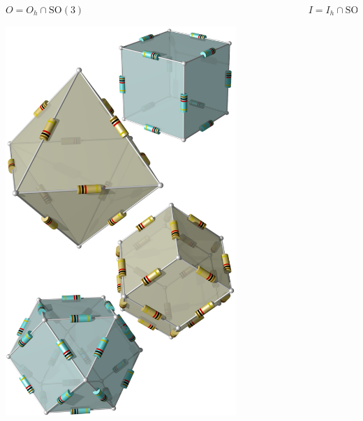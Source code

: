 \begin{frame}[t]
\begin{columns}[t,onlytextwidth]
\begin{column}{0.33\textwidth}
\begin{block}{$O = O_h \cap \operatorname{SO(3)}$}
\begin{center}
\includegraphics[width=0.8\textwidth]{../slides/6/punktgruppen/toi/O.jpg}
\end{center}
\end{block}
\end{column}
\begin{column}{0.33\textwidth}
\begin{block}{$I = I_h \cap \operatorname{SO(3)}$}
\begin{center}

\end{center}
\end{block}
\end{column}
\end{columns}
\end{frame}

